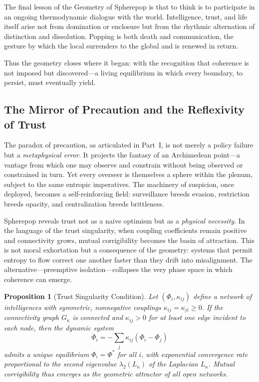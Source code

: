 \documentclass[12pt]{article}
\newtheorem{proposition}{Proposition}
\begin{document}
The final lesson of the Geometry of Spherepop is that to think is to participate in an ongoing thermodynamic dialogue with the world. Intelligence, trust, and life itself arise not from domination or enclosure but from the rhythmic alternation of distinction and dissolution. Popping is both death and communication, the gesture by which the local surrenders to the global and is renewed in return. 

Thus the geometry closes where it began: with the recognition that coherence is not imposed but discovered---a living equilibrium in which every boundary, to persist, must eventually yield.


\subsection*{The Mirror of Precaution and the Reflexivity of Trust}

The paradox of precaution, as articulated in Part~I, is not merely a policy failure but a \emph{metaphysical error}. It projects the fantasy of an Archimedean point---a vantage from which one may observe and constrain without being observed or constrained in turn. Yet every overseer is themselves a sphere within the plenum, subject to the same entropic imperatives. The machinery of suspicion, once deployed, becomes a self-reinforcing field: surveillance breeds evasion, restriction breeds opacity, and centralization breeds brittleness.

Spherepop reveals trust not as a naive optimism but as a \emph{physical necessity}. In the language of the trust singularity, when coupling coefficients remain positive and connectivity grows, mutual corrigibility becomes the basin of attraction. This is not moral exhortation but a consequence of the geometry: systems that permit entropy to flow correct one another faster than they drift into misalignment. The alternative---preemptive isolation---collapses the very phase space in which coherence can emerge.

\begin{proposition}[Trust Singularity Condition]
Let $(\Phi_i, \kappa_{ij})$ define a network of intelligences with symmetric, nonnegative couplings $\kappa_{ij}=\kappa_{ji}\ge0$. If the connectivity graph $G_\kappa$ is connected and $\kappa_{ij}>0$ for at least one edge incident to each node, then the dynamic system
\begin{equation}
\dot{\Phi}_i = -\sum_j \kappa_{ij}(\Phi_i - \Phi_j)
\end{equation}
admits a unique equilibrium $\Phi_i=\Phi^*$ for all $i$, with exponential convergence rate proportional to the second eigenvalue $\lambda_2(L_\kappa)$ of the Laplacian $L_\kappa$. Mutual corrigibility thus emerges as the \emph{geometric attractor} of all open networks.
\end{proposition}
\end{document}
